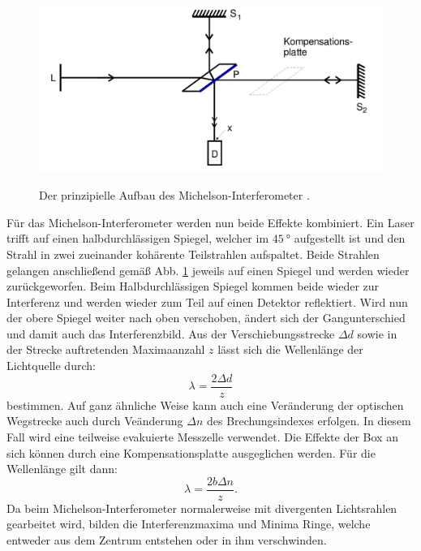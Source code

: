   \begin{figure}
  	\centering
  	\caption{Der prinzipielle Aufbau des Michelson-Interferometer \cite{V401}.}
  	\includegraphics[width=\linewidth-150pt,height=\textheight-150pt,keepaspectratio]{content/theoriebau.png}
  	\label{fig:aufbauth}
  \end{figure}
  Für das Michelson-Interferometer werden nun beide Effekte kombiniert. Ein Laser trifft
  auf einen halbdurchlässigen Spiegel, welcher im $\SI{45}{\degree}$ aufgestellt ist und
  den Strahl in zwei zueinander kohärente Teilstrahlen aufspaltet. Beide Strahlen gelangen anschließend
  gemäß Abb. \ref{fig:aufbauth} jeweils auf einen Spiegel und werden wieder zurückgeworfen. Beim
  Halbdurchlässigen Spiegel kommen beide wieder zur Interferenz und werden wieder zum Teil auf
  einen Detektor reflektiert. Wird nun der obere Spiegel weiter nach oben verschoben,
  ändert sich der Gangunterschied und damit auch das Interferenzbild. Aus der Verschiebungsstrecke
  $\Delta d$ sowie in der Strecke auftretenden Maximaanzahl $z$ lässt sich die Wellenlänge der Lichtquelle durch:
  \begin{equation}
    \lambda = \frac{2 \Delta d}{z}\label{lambda}
    \end{equation}
    bestimmen. Auf ganz ähnliche Weise kann auch eine Veränderung der optischen Wegstrecke
     auch durch Veänderung $\Delta n$ des Brechungsindexes erfolgen. In diesem Fall wird eine teilweise evakuierte Messzelle verwendet.
     Die Effekte der Box an sich können durch eine Kompensationsplatte ausgeglichen werden. Für die Wellenlänge gilt dann:
     \begin{equation}
       \lambda = \frac{2 b \Delta n }{z}\text{.}\label{nausdeltan}
       \end{equation}
Da beim Michelson-Interferometer normalerweise mit divergenten Lichtsrahlen gearbeitet wird,
bilden die Interferenzmaxima und Minima Ringe, welche entweder aus dem Zentrum entstehen oder in ihm verschwinden.
